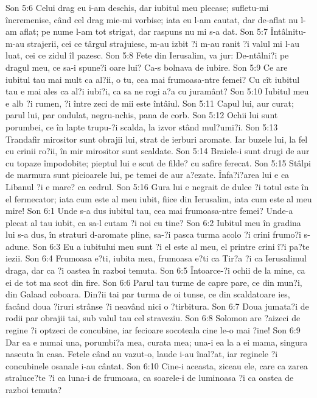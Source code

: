 Son 5:6  Celui drag eu i-am deschis, dar iubitul meu plecase; sufletu-mi încremenise, când cel drag mie-mi vorbise; iata eu l-am cautat, dar de-aflat nu l-am aflat; pe nume l-am tot strigat, dar raspuns nu mi s-a dat.
Son 5:7  Întâlnitu-m-au strajerii, cei ce târgul strajuiesc, m-au izbit ?i m-au ranit ?i valul mi l-au luat, cei ce zidul îl pazesc.
Son 5:8  Fete din Ierusalim, va jur: De-ntâlni?i pe dragul meu, ce sa-i spune?i oare lui? Ca-s bolnava de iubire.
Son 5:9  Ce are iubitul tau mai mult ca al?ii, o tu, cea mai frumoasa-ntre femei? Cu cît iubitul tau e mai ales ca al?i iubi?i, ca sa ne rogi a?a cu juramânt?
Son 5:10  Iubitul meu e alb ?i rumen, ?i între zeci de mii este întâiul.
Son 5:11  Capul lui, aur curat; parul lui, par ondulat, negru-nchis, pana de corb.
Son 5:12  Ochii lui sunt porumbei, ce în lapte trupu-?i scalda, la izvor stând mul?umi?i.
Son 5:13  Trandafir mirositor sunt obrajii lui, strat de ierburi aromate. Iar buzele lui, la fel cu crinii ro?ii, în mir mirositor sunt scaldate.
Son 5:14  Braiele-i sunt drugi de aur cu topaze împodobite; pieptul lui e scut de filde? cu safire ferecat.
Son 5:15  Stâlpi de marmura sunt picioarele lui, pe temei de aur a?ezate. Înfa?i?area lui e ca Libanul ?i e mare? ca cedrul.
Son 5:16  Gura lui e negrait de dulce ?i totul este în el fermecator; iata cum este al meu iubit, fiice din Ierusalim, iata cum este al meu mire!
Son 6:1  Unde s-a dus iubitul tau, cea mai frumoasa-ntre femei? Unde-a plecat al tau iubit, ca sa-l cutam ?i noi cu tine?
Son 6:2  Iubitul meu în gradina lui s-a dus, în straturi d-aromate pline, sa-?i pasca turma acolo ?i crini frumo?i s-adune.
Son 6:3  Eu a iubitului meu sunt ?i el este al meu, el printre crini î?i pa?te iezii.
Son 6:4  Frumoasa e?ti, iubita mea, frumoasa e?ti ca Tir?a ?i ca Ierusalimul draga, dar ca ?i oastea în razboi temuta.
Son 6:5  Întoarce-?i ochii de la mine, ca ei de tot ma scot din fire.
Son 6:6  Parul tau turme de capre pare, ce din mun?i, din Galaad coboara. Din?ii tai par turma de oi tunse, ce din scaldatoare ies, facând doua ?iruri strânse ?i neavând nici o ?tirbitura.
Son 6:7  Doua jumata?i de rodii par obrajii tai, sub valul tau cel straveziu.
Son 6:8  Solomon are ?aizeci de regine ?i optzeci de concubine, iar fecioare socoteala cine le-o mai ?ine!
Son 6:9  Dar ea e numai una, porumbi?a mea, curata mea; una-i ea la a ei mama, singura nascuta în casa. Fetele când au vazut-o, laude i-au înal?at, iar reginele ?i concubinele osanale i-au cântat.
Son 6:10  Cine-i aceasta, ziceau ele, care ca zarea straluce?te ?i ca luna-i de frumoasa, ca soarele-i de luminoasa ?i ca oastea de razboi temuta?
